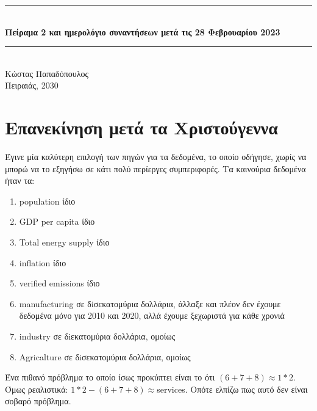 \documentclass[a4paper,twoside,10pt]{article}
\begin{document}
	\begin{titlepage}
		\newcommand{\HRule}{\rule{\linewidth}{0.5mm}} %
		
		\center %
		
		
		
		
		\HRule \\[0.75cm]
		
		{ \huge \bfseries Πείραμα 2 και ημερολόγιο συναντήσεων μετά τις 28 Φεβρουαρίου 2023}
		\\[0.4cm] %
		\HRule \\[1cm]
		
		{ \large Κώστας Παπαδόπουλος}\\[1cm] %
		{ \large Πειραιάς, 2030}\\[1cm] %
		\tableofcontents
		
		\vfill %
	\end{titlepage}
	
	

	\section{Επανεκίνηση μετά τα Χριστούγεννα}
	Έγινε μία καλύτερη επιλογή των πηγών για τα δεδομένα, το οποίο οδήγησε, χωρίς να μπορώ να το εξηγήσω σε κάτι πολύ περίεργες συμπεριφορές.
	Τα καινούρια δεδομένα ήταν τα:
	\begin{enumerate}
		\item population ίδιο
		\item GDP per capita ίδιο
		\item Total energy supply ίδιο
		\item inflation ίδιο
		\item verified emissions ίδιο
		\item manufacturing σε δiσεκατομύρια δολλάρια, άλλαξε και πλέον δεν έχουμε δεδομένα μόνο για 2010 και 2020, αλλά έχουμε ξεχωριστά για κάθε χρονιά
		\item industry σε δiεκατομύρια δολλάρια, ομοίως
		\item Agricalture σε δiσεκατομύρια δολλάρια, ομοίως
	\end{enumerate}
	Ένα πιθανό πρόβλημα το οποίο ίσως προκύπτει είναι το ότι $(6+7+8) \approx 1*2$. Όμως ρεαλιστικά: $1*2 - (6+7+8) \approx $services. Οπότε ελπίζω πως αυτό δεν είναι σοβαρό πρόβλημα. 
	
\end{document}
